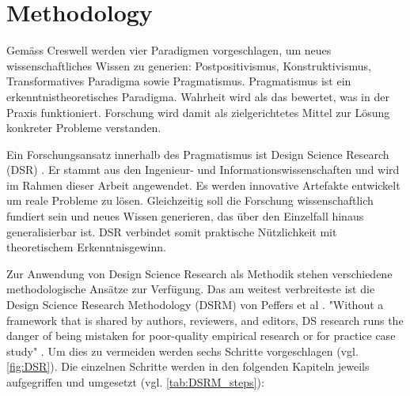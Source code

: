\chapter{Methodology}
\label{sec:methodology}

\begin{German}
    Gemäss Creswell \cite{creswellHttpsWwwucgacmeSkladiste} werden vier Paradigmen vorgeschlagen, um neues wissenschaftliches Wissen zu generien: Postpositivismus, Konstruktivismus, Transformatives Paradigma sowie Pragmatismus. Pragmatismus ist ein erkenntnistheoretisches Paradigma. Wahrheit wird als das bewertet, was in der Praxis funktioniert. Forschung wird damit als zielgerichtetes Mittel zur Lösung konkreter Probleme verstanden.
    
    Ein Forschungsansatz innerhalb des Pragmatismus ist Design Science Research (DSR) \cite{desordiDesignScienceResearch2021}. Er stammt aus den Ingenieur- und Informationswissenschaften und wird im Rahmen dieser Arbeit angewendet. Es werden innovative Artefakte entwickelt um reale Probleme zu lösen. Gleichzeitig soll die Forschung wissenschaftlich fundiert sein und neues Wissen generieren, das über den Einzelfall hinaus generalisierbar ist. DSR verbindet somit praktische Nützlichkeit mit theoretischem Erkenntnisgewinn.
            
    Zur Anwendung von Design Science Research als Methodik stehen verschiedene methodologische Ansätze zur Verfügung. Das am weitest verbreiteste \cite{desordiDesignScienceResearch2021} ist die Design Science Research Methodology (DSRM) von Peffers et al \cite{peffersPDFDesignScience2024}. "Without a framework that is shared by authors, reviewers, and editors, DS research runs the danger of being mistaken for poor-quality empirical research or for practice case study" \cite{peffersPDFDesignScience2024}. Um dies zu vermeiden werden sechs Schritte vorgeschlagen (vgl. \ref{fig:DSR}). Die einzelnen Schritte werden in den folgenden Kapiteln jeweils aufgegriffen und umgesetzt (vgl. \ref{tab:DSRM_steps}):
\end{German}

